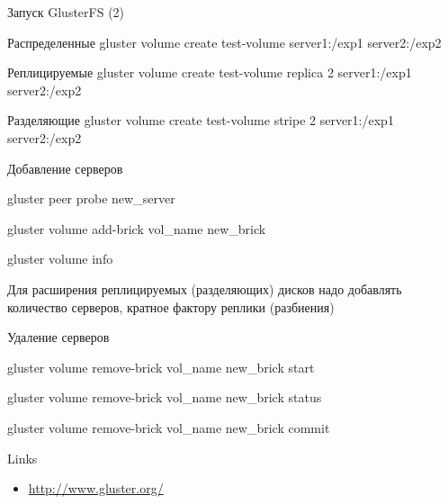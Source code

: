 \documentclass{beamer}
\begin{document}
\begin{frame}{Запуск GlusterFS (2)}
	\begin{block}{Распределенные}
		gluster volume create test-volume server1:/exp1 server2:/exp2
	\end{block}
	\begin{block}{Реплицируемые}
		gluster volume create test-volume replica 2 server1:/exp1 server2:/exp2
	\end{block}
	\begin{block}{Разделяющие}
		gluster volume create test-volume stripe 2 server1:/exp1 server2:/exp2
	\end{block}
\end{frame}

\begin{frame}{Добавление серверов}
	\begin{block}{} 
		gluster peer probe new\_server

		\pause
		gluster volume add-brick vol\_name new\_brick

		\pause
		gluster volume info
	\end{block}
	\pause
	\vspace{1cm}
	Для расширения реплицируемых (разделяющих) дисков надо добавлять количество серверов, кратное фактору реплики (разбиения)
\end{frame}

\begin{frame}{Удаление серверов}
	\begin{block}{} 
		gluster volume remove-brick vol\_name new\_brick start

		\pause
		gluster volume remove-brick vol\_name new\_brick status

		\pause
		gluster volume remove-brick vol\_name new\_brick commit
	\end{block}
\end{frame}

\begin{frame}{Links}
	\begin{itemize}
		\item \url{http://www.gluster.org/}
	\end{itemize}
\end{frame}
\end{document}
